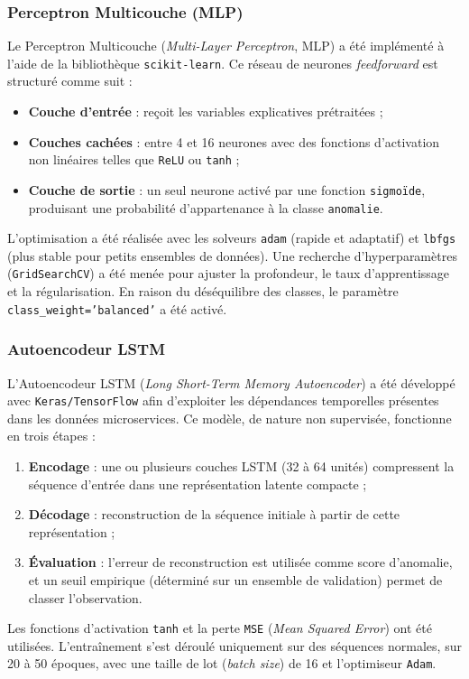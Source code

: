 \documentclass[conference]{IEEEtran}
\begin{document}
\subsubsection{Perceptron Multicouche (MLP)}
Le Perceptron Multicouche (\textit{Multi-Layer Perceptron}, MLP) a été implémenté à l’aide de la bibliothèque \texttt{scikit-learn}.  
Ce réseau de neurones \textit{feedforward} est structuré comme suit :
\begin{itemize}
    \item \textbf{Couche d’entrée} : reçoit les variables explicatives prétraitées ;
    \item \textbf{Couches cachées} : entre 4 et 16 neurones avec des fonctions d’activation non linéaires telles que \texttt{ReLU} ou \texttt{tanh} ;
    \item \textbf{Couche de sortie} : un seul neurone activé par une fonction \texttt{sigmoïde}, produisant une probabilité d’appartenance à la classe \texttt{anomalie}.
\end{itemize}
L’optimisation a été réalisée avec les solveurs \texttt{adam} (rapide et adaptatif) et \texttt{lbfgs} (plus stable pour petits ensembles de données).  
Une recherche d’hyperparamètres (\texttt{GridSearchCV}) a été menée pour ajuster la profondeur, le taux d’apprentissage et la régularisation.  
En raison du déséquilibre des classes, le paramètre \texttt{class\_weight='balanced'} a été activé.

\subsubsection{Autoencodeur LSTM}
L’Autoencodeur LSTM (\textit{Long Short-Term Memory Autoencoder}) a été développé avec \texttt{Keras/TensorFlow} afin d’exploiter les dépendances temporelles présentes dans les données microservices.
Ce modèle, de nature non supervisée, fonctionne en trois étapes :
\begin{enumerate}
    \item \textbf{Encodage} : une ou plusieurs couches LSTM (32 à 64 unités) compressent la séquence d’entrée dans une représentation latente compacte ;
    \item \textbf{Décodage} : reconstruction de la séquence initiale à partir de cette représentation ;
    \item \textbf{Évaluation} : l’erreur de reconstruction est utilisée comme score d’anomalie, et un seuil empirique (déterminé sur un ensemble de validation) permet de classer l’observation.
\end{enumerate}
Les fonctions d’activation \texttt{tanh} et la perte \texttt{MSE} (\textit{Mean Squared Error}) ont été utilisées.  
L’entraînement s’est déroulé uniquement sur des séquences normales, sur 20 à 50 époques, avec une taille de lot (\textit{batch size}) de 16 et l’optimiseur \texttt{Adam}.
\end{document}
